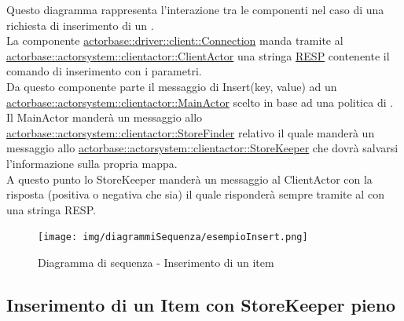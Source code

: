 \documentclass{scalatekids-article}
\begin{document}
Questo diagramma rappresenta l'interazione tra le componenti nel caso di una richiesta di inserimento di un .\\
La componente \hyperref[sec:actorbase::driver::client::Connection]{actorbase::driver::client::Connection}
manda tramite  al \hyperref[sec:actorbase::actorsystem::clientactor::ClientActor]{actorbase::actorsystem::clientactor::ClientActor}
una stringa \hyperref[sec:RESP]{RESP} contenente il comando di inserimento  con
i parametri.\\
Da questo componente parte il messaggio di Insert(key, value) ad un \hyperref[sec:actorbase::actorsystem::clientactor::MainActor]{actorbase::actorsystem::clientactor::MainActor} scelto in base ad una
politica di . Il MainActor manderà un messaggio allo \hyperref[sec:actorbase::actorsystem::clientactor::StoreFinder]{actorbase::actorsystem::clientactor::StoreFinder} relativo il quale manderà un messaggio allo \hyperref[sec:actorbase::actorsystem::clientactor::StoreKeeper]{actorbase::actorsystem::clientactor::StoreKeeper} che dovrà salvarsi l'informazione
sulla propria mappa.\\
A questo punto lo StoreKeeper manderà un messaggio al ClientActor con la risposta
(positiva o negativa che sia) il quale risponderà sempre tramite  al  con una stringa RESP.
\begin{figure}[H]
  \begin{center}
    \texttt{[image: img/diagrammiSequenza/esempioInsert.png]}
    \caption{Diagramma di sequenza - Inserimento di un item}
  \end{center}
\end{figure}

\subsection{Inserimento di un Item con StoreKeeper pieno}
\end{document}
